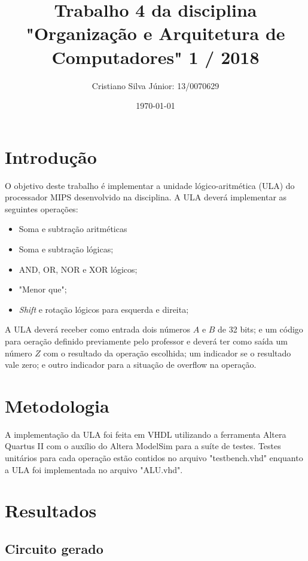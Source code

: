 \documentclass[12pt, a4paper, twoside]{article}
\begin{document}
\title{Trabalho 4 da disciplina "Organização e Arquitetura de Computadores" 1 /
2018}
\author{Cristiano Silva Júnior: 13/0070629}
\date{\today}
\maketitle

\section{Introdução}

O objetivo deste trabalho é implementar a unidade lógico-aritmética (ULA) do
processador MIPS desenvolvido na disciplina. A ULA deverá implementar as
seguintes operações:

\begin{itemize}
    \item Soma e subtração aritméticas
    \item Soma e subtração lógicas;
    \item AND, OR, NOR e XOR lógicos;
    \item "Menor que";
    \item \textit{Shift} e rotação lógicos para esquerda e direita;
\end{itemize}

A ULA deverá receber como entrada dois números $A$ e $B$ de 32 bits; e um
código para oeração definido previamente pelo professor e deverá ter como saída
um número $Z$ com o resultado da operação escolhida; um indicador se o
resultado vale zero; e outro indicador para a situação de overflow na operação.

\section{Metodologia}

A implementação da ULA foi feita em VHDL utilizando a ferramenta Altera Quartus
II com o auxílio do Altera ModelSim para a suíte de testes. Testes unitários
para cada operação estão contidos no arquivo "testbench.vhd" enquanto a ULA
foi implementada no arquivo "ALU.vhd".

\section{Resultados}

\subsection{Circuito gerado}
\end{document}
